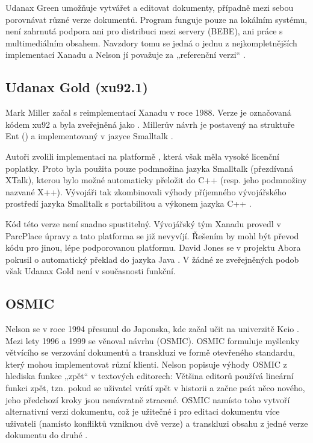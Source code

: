 
Udanax Green umožňuje vytvářet a editovat dokumenty, případně mezi sebou porovnávat různé verze dokumentů. Program funguje pouze na lokálním systému, není zahrnutá podpora ani pro distribuci mezi servery (BEBE), ani práce s multimediálním obsahem.
Navzdory tomu se jedná o jednu z nejkompletnějších implementací Xanadu a Nelson jí považuje za „referenční verzi“ \autocite[9]{xanalogical}.

\subsection{Udanax Gold (xu92.1)}
\label{sec:impl:gold}

Mark Miller začal s reimplementací Xanadu v roce 1988. Verze je označovaná kódem xu92 a byla zveřejněná jako .
Millerův návrh je postavený na struktuře Ent () a implementovaný v jazyce Smalltalk \autocite{Udanax:Gold}.

Autoři zvolili implementaci na platformě , která však měla vysoké licenční poplatky. Proto byla použita pouze podmnožina jazyka Smalltalk (přezdívaná XTalk), kterou bylo možné automaticky přeložit do C++ (resp. jeho podmnožiny nazvané X++). Vývojáři tak zkombinovali výhody příjemného vývojářského prostředí jazyka Smalltalk s portabilitou a výkonem jazyka C++ \autocite{Udanax:Gold}.

Kód této verze není snadno spustitelný. Vývojářský tým Xanadu provedl v ParcPlace úpravy a tato platforma se již nevyvíjí. Řešením by mohl být převod kódu pro jinou, lépe podporovanou platformu. David Jones se v projektu Abora pokusil o automatický překlad do jazyka Java \autocite{Abora}. V žádné ze zveřejněných podob však Udanax Gold není v současnosti funkční.

\subsection{OSMIC}
\label{sec:osmic}

Nelson se v roce 1994 přesunul do Japonska, kde začal učit na univerzitě Keio \autocite[4]{XanaFAQ}. Mezi lety 1996 a 1999 se věnoval návrhu  (OSMIC). OSMIC formuluje myšlenky větvícího se verzování dokumentů a transkluzi ve formě otevřeného standardu, který mohou implementovat různí klienti. Nelson popisuje výhody OSMIC z hlediska funkce „zpět“ v textových editorech: Většina editorů používá lineární funkci zpět, tzn. pokud se uživatel vrátí zpět v historii a začne psát něco nového, jeho předchozí kroky jsou nenávratně ztracené. OSMIC namísto toho vytvoří alternativní verzi dokumentu, což je užitečné i pro editaci dokumentu více uživateli (namísto konfliktů vzniknou dvě verze) a transkluzi obsahu z jedné verze dokumentu do druhé \autocite{OSMIC:time}.


